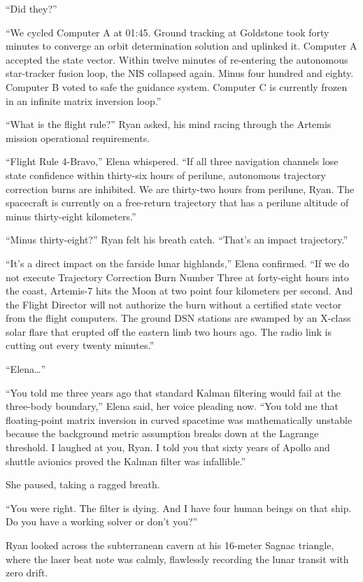 \documentclass[12pt,twoside,openright]{book}
\begin{document}
``Did they?''

``We cycled Computer A at 01:45. Ground tracking at Goldstone took forty
minutes to converge an orbit determination solution and uplinked it.
Computer A accepted the state vector. Within twelve minutes of
re-entering the autonomous star-tracker fusion loop, the NIS collapsed
again. Minus four hundred and eighty. Computer B voted to safe the
guidance system. Computer C is currently frozen in an infinite matrix
inversion loop.''

``What is the flight rule?'' Ryan asked, his mind racing through the
Artemis mission operational requirements.

``Flight Rule 4-Bravo,'' Elena whispered. ``If all three navigation
channels lose state confidence within thirty-six hours of perilune,
autonomous trajectory correction burns are inhibited. We are thirty-two
hours from perilune, Ryan. The spacecraft is currently on a free-return
trajectory that has a perilune altitude of minus thirty-eight
kilometers.''

``Minus thirty-eight?'' Ryan felt his breath catch. ``That's an impact
trajectory.''

``It's a direct impact on the farside lunar highlands,'' Elena
confirmed. ``If we do not execute Trajectory Correction Burn Number
Three at forty-eight hours into the coast, Artemis-7 hits the Moon at
two point four kilometers per second. And the Flight Director will not
authorize the burn without a certified state vector from the flight
computers. The ground DSN stations are swamped by an X-class solar flare
that erupted off the eastern limb two hours ago. The radio link is
cutting out every twenty minutes.''

``Elena\ldots{}''

``You told me three years ago that standard Kalman filtering would fail
at the three-body boundary,'' Elena said, her voice pleading now. ``You
told me that floating-point matrix inversion in curved spacetime was
mathematically unstable because the background metric assumption breaks
down at the Lagrange threshold. I laughed at you, Ryan. I told you that
sixty years of Apollo and shuttle avionics proved the Kalman filter was
infallible.''

She paused, taking a ragged breath.

``You were right. The filter is dying. And I have four human beings on
that ship. Do you have a working solver or don't you?''

Ryan looked across the subterranean cavern at his 16-meter Sagnac
triangle, where the laser beat note was calmly, flawlessly recording the
lunar transit with zero drift.
\end{document}
